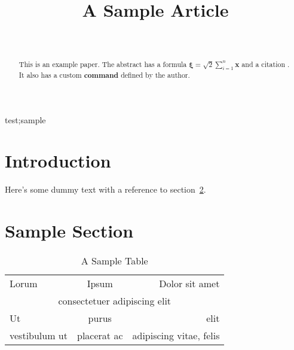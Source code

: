 \documentclass[wcp]{jmlr}
\author{\Name{Ann
Other}\Email{sample@nowhere.com}\\\addr{University of Nowhere}}
\title{A Sample Article}
\newcommand*{\boldstuff}[1]{\textbf{#1}}
\begin{document}
\maketitle

\begin{abstract}
This is an example paper. The abstract has a formula
$\boldsymbol{\xi} = \surd2 \sum_{i=1}^n \mathbf{x}$
and a citation \citep{smith2005}. It also has a custom
\boldstuff{command} defined by the author.
\end{abstract}
\begin{keywords}
test;sample
\end{keywords}

\section{Introduction}

Here's some dummy text with a reference to section~\ref{sec:sample}.

\section{Sample Section}
\label{sec:sample}

\begin{table}[htbp]
\caption{A Sample Table}\label{tab:sample}
\centering
\begin{tabular}{lcr}
Lorum & Ipsum & Dolor sit amet\\
\multicolumn{3}{c}{consectetuer adipiscing elit}\\
Ut & purus & elit\\
vestibulum ut & placerat ac & adipiscing vitae, felis
\end{tabular}
\end{table}


\end{document}
